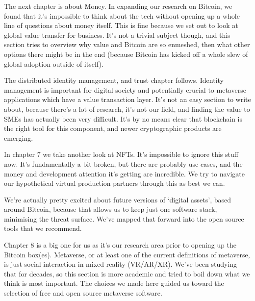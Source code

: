 The next chapter is about Money. In expanding our research on Bitcoin, we found that it’s impossible to think about the tech without opening up a whole line of questions about money itself. This is fine because we set out to look at global value transfer for business. It’s not a trivial subject though, and this section tries to overview why value and Bitcoin are so enmeshed, then what other options there might be in the end (because Bitcoin has kicked off a whole slew of global adoption outside of itself).\par
The distributed identity management, and trust chapter follows. Identity management is important for digital society and potentially crucial to metaverse applications which have a value transaction layer. It’s not an easy section to write about, because there’s a lot of research, it’s not our field, and finding the value to SMEs has actually been very difficult. It's by no means clear that blockchain is the right tool for this component, and newer cryptographic products are emerging.\par %
In chapter 7 we take another look at NFTs. It’s impossible to ignore this stuff now. It’s fundamentally a bit broken, but there are probably use cases, and the money and development attention it’s getting are incredible. We try to navigate our hypothetical virtual production partners through this as best we can. \par %
We’re actually pretty excited about future versions of `digital assets', based around Bitcoin, because that allows us to keep just one software stack, minimising the threat surface. We’ve mapped that forward into the open source tools that we recommend.\par
Chapter 8 is a big one for us as it’s our research area prior to opening up the Bitcoin box(es). Metaverse, or at least one of the current definitions of metaverse, is just social interaction in mixed reality (VR/AR/XR). We’ve been studying that for decades, so this section is more academic and tried to boil down what we think is most important. The choices we made here guided us toward the selection of free and open source metaverse software.\par

